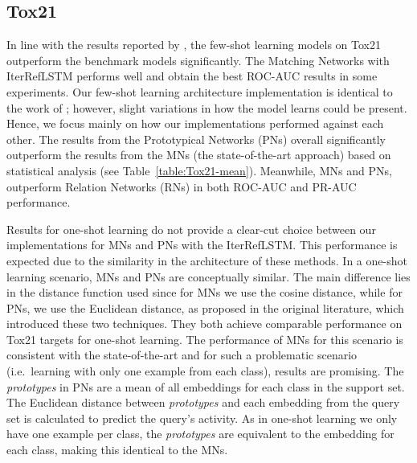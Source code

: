 \documentclass[journal=jcisd8,manuscript=article]{achemso} %
\begin{document}
\subsection{Tox21}

In line with the results reported by \citet{altae2017low}, the few-shot learning models on Tox21 outperform the benchmark models significantly. The Matching Networks with IterRefLSTM performs well and obtain the best ROC-AUC results in some experiments. Our few-shot learning architecture implementation is identical to the work of \citet{altae2017low}; however, slight variations in how the model learns could be present. Hence, we focus mainly on how our implementations performed against each other. The results from the Prototypical Networks (PNs) overall significantly outperform the results from the MNs (the state-of-the-art approach) based on statistical analysis (see Table~\ref{table:Tox21-mean}). Meanwhile, MNs and PNs, outperform Relation Networks (RNs) in both ROC-AUC and PR-AUC performance. 

Results for one-shot learning do not provide a clear-cut choice between our implementations for MNs and PNs with the IterRefLSTM. This performance is expected due to the similarity in the architecture of these methods. In a one-shot learning scenario, MNs and PNs are conceptually similar. The main difference lies in the distance function used since for MNs we use the cosine distance, while for PNs, we use the Euclidean distance, as proposed in the original literature, which introduced these two techniques. They both achieve comparable performance on Tox21 targets for one-shot learning. The performance of MNs for this scenario is consistent with the state-of-the-art and for such a problematic scenario (i.e.\ learning with only one example from each class), results are promising. The \textit{prototypes} in PNs are a mean of all embeddings for each class in the support set. The Euclidean distance between \textit{prototypes} and each embedding from the query set is calculated to predict the query's activity. As in one-shot learning we only have one example per class, the \textit{prototypes} are equivalent to the embedding for each class, making this identical to the MNs. 
\end{document}
